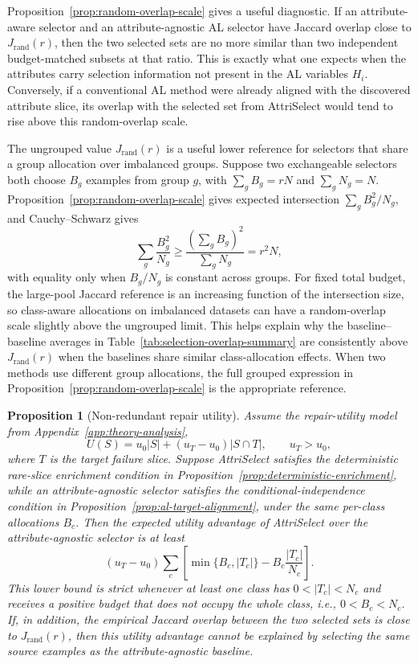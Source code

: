 \documentclass{article}
\newcommand{\model}{AttriSelect\xspace}
\newtheorem{proposition}{Proposition}
\begin{document}
Proposition~\ref{prop:random-overlap-scale} gives a useful diagnostic. If an attribute-aware selector and an attribute-agnostic AL selector have Jaccard overlap close to $J_{\mathrm{rand}}(r)$, then the two selected sets are no more similar than two independent budget-matched subsets at that ratio. This is exactly what one expects when the attributes carry selection information not present in the AL variables $H_i$. Conversely, if a conventional AL method were already aligned with the discovered attribute slice, its overlap with the selected set from \model would tend to rise above this random-overlap scale.

The ungrouped value $J_{\mathrm{rand}}(r)$ is a useful lower reference for selectors that share a group allocation over imbalanced groups. Suppose two exchangeable selectors both choose $B_g$ examples from group $g$, with $\sum_g B_g=rN$ and $\sum_g N_g=N$. Proposition~\ref{prop:random-overlap-scale} gives expected intersection $\sum_g B_g^2/N_g$, and Cauchy--Schwarz gives
\begin{equation}
\sum_g \frac{B_g^2}{N_g}
\geq
\frac{\left(\sum_g B_g\right)^2}{\sum_g N_g}
=
r^2N,
\end{equation}
with equality only when $B_g/N_g$ is constant across groups. For fixed total budget, the large-pool Jaccard reference is an increasing function of the intersection size, so class-aware allocations on imbalanced datasets can have a random-overlap scale slightly above the ungrouped limit. This helps explain why the baseline--baseline averages in Table~\ref{tab:selection-overlap-summary} are consistently above $J_{\mathrm{rand}}(r)$ when the baselines share similar class-allocation effects. When two methods use different group allocations, the full grouped expression in Proposition~\ref{prop:random-overlap-scale} is the appropriate reference.

\begin{proposition}[Non-redundant repair utility]
\label{prop:nonredundant-utility}
Assume the repair-utility model from Appendix~\ref{app:theory-analysis},
\begin{equation}
U(S)=u_0|S|+(u_T-u_0)|S\cap T|,\qquad u_T>u_0,
\end{equation}
where $T$ is the target failure slice. Suppose \model satisfies the deterministic rare-slice enrichment condition in Proposition~\ref{prop:deterministic-enrichment}, while an attribute-agnostic selector satisfies the conditional-independence condition in Proposition~\ref{prop:al-target-alignment}, under the same per-class allocations $B_c$. Then the expected utility advantage of \model over the attribute-agnostic selector is at least
\begin{equation}
(u_T-u_0)
\sum_c
\left[
\min\{B_c,|T_c|\}
-
B_c\frac{|T_c|}{N_c}
\right].
\end{equation}
This lower bound is strict whenever at least one class has $0<|T_c|<N_c$ and receives a positive budget that does not occupy the whole class, i.e., $0<B_c<N_c$. If, in addition, the empirical Jaccard overlap between the two selected sets is close to $J_{\mathrm{rand}}(r)$, then this utility advantage cannot be explained by selecting the same source examples as the attribute-agnostic baseline.
\end{proposition}
\end{document}
